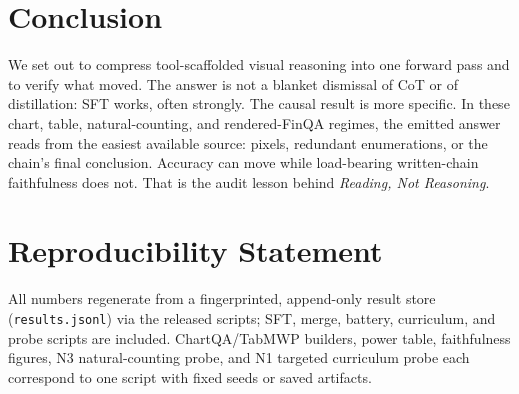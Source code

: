 \documentclass[11pt]{article}
\begin{document}
\section{Conclusion}
\label{sec:conclusion}

We set out to compress tool-scaffolded visual reasoning into one forward pass and to verify what moved. The answer is not a blanket dismissal of CoT or of distillation: SFT works, often strongly. The causal result is more specific. In these chart, table, natural-counting, and rendered-FinQA regimes, the emitted answer reads from the easiest available source: pixels, redundant enumerations, or the chain's final conclusion. Accuracy can move while load-bearing written-chain faithfulness does not. That is the audit lesson behind \emph{Reading, Not Reasoning}.

\section*{Reproducibility Statement}
\label{sec:repro}
All numbers regenerate from a fingerprinted, append-only result store (\texttt{results.jsonl}) via the released scripts; SFT, merge, battery, curriculum, and probe scripts are included. ChartQA/TabMWP builders, power table, faithfulness figures, N3 natural-counting probe, and N1 targeted curriculum probe each correspond to one script with fixed seeds or saved artifacts.



\end{document}
